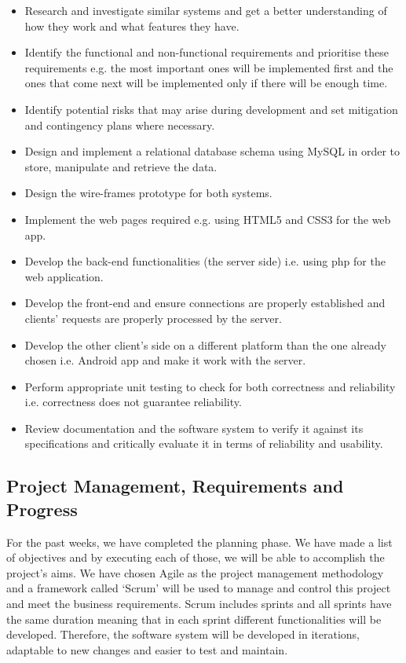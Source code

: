\documentclass{article}
\begin{document}
\begin{itemize}
\item Research and investigate similar systems and get a better understanding of how they work and what features they have. 
\item Identify the functional and non-functional requirements and prioritise these requirements e.g. the most important ones will be implemented first and the ones that come next will be implemented only if there will be enough time. 
\item Identify potential risks that may arise during development and set mitigation and contingency plans where necessary. 
\item Design and implement a relational database schema using MySQL in order to store, manipulate and retrieve the data. 
\item Design the wire-frames prototype for both systems. 
\item Implement the web pages required e.g. using HTML5 and CSS3 for the web app. 
\item Develop the back-end functionalities (the server side) i.e. using php for the web application. 
\item Develop the front-end and ensure connections are properly established and clients’ requests are properly processed by the server. 
\item Develop the other client’s side on a different platform than the one already chosen i.e. Android app and make it work with the server. 
\item Perform appropriate unit testing to check for both correctness and reliability i.e. correctness does not guarantee reliability. 
\item Review documentation and the software system to verify it against its specifications and critically evaluate it in terms of reliability and usability. 
\end{itemize}

\subsection{Project Management, Requirements and Progress}

\begin{flushleft}
For the past weeks, we have completed the planning phase. We have made a list of objectives and by executing each of those, we will be able to accomplish the project’s aims. We have chosen Agile as the project management methodology and a framework called ‘Scrum’ will be used to manage and control this project and meet the business requirements. Scrum includes sprints and all sprints have the same duration meaning that in each sprint different functionalities will be developed. Therefore, the software system will be developed in iterations, adaptable to new changes and easier to test and maintain.
\end {flushleft}
\end{document}
